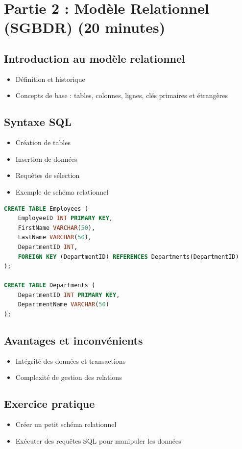 \documentclass{article}
\begin{document}
\section{Partie 2 : Modèle Relationnel (SGBDR) (20 minutes)}
\subsection{Introduction au modèle relationnel}
\begin{itemize}
    \item Définition et historique
    \item Concepts de base : tables, colonnes, lignes, clés primaires et étrangères
\end{itemize}

\subsection{Syntaxe SQL}
\begin{itemize}
    \item Création de tables
    \item Insertion de données
    \item Requêtes de sélection
    \item Exemple de schéma relationnel
\end{itemize}

\begin{lstlisting}[language=SQL, caption=Exemple de schéma relationnel en SQL]
CREATE TABLE Employees (
    EmployeeID INT PRIMARY KEY,
    FirstName VARCHAR(50),
    LastName VARCHAR(50),
    DepartmentID INT,
    FOREIGN KEY (DepartmentID) REFERENCES Departments(DepartmentID)
);

CREATE TABLE Departments (
    DepartmentID INT PRIMARY KEY,
    DepartmentName VARCHAR(50)
);
\end{lstlisting}

\subsection{Avantages et inconvénients}
\begin{itemize}
    \item Intégrité des données et transactions
    \item Complexité de gestion des relations
\end{itemize}

\subsection{Exercice pratique}
\begin{itemize}
    \item Créer un petit schéma relationnel
    \item Exécuter des requêtes SQL pour manipuler les données
\end{itemize}
\end{document}
